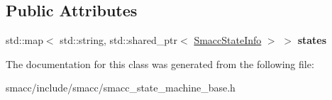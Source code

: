 \subsection*{Public Attributes}
\begin{DoxyCompactItemize}
\item 
std\+::map$<$ std\+::string, std\+::shared\+\_\+ptr$<$ \hyperlink{classsmacc_1_1SmaccStateInfo}{Smacc\+State\+Info} $>$ $>$ {\bfseries states}\hypertarget{classsmacc_1_1SmaccStateMachineInfo_ab5d31ae049139eddad79708a885d1c25}{}\label{classsmacc_1_1SmaccStateMachineInfo_ab5d31ae049139eddad79708a885d1c25}

\end{DoxyCompactItemize}


The documentation for this class was generated from the following file\+:\begin{DoxyCompactItemize}
\item 
smacc/include/smacc/smacc\+\_\+state\+\_\+machine\+\_\+base.\+h\end{DoxyCompactItemize}
